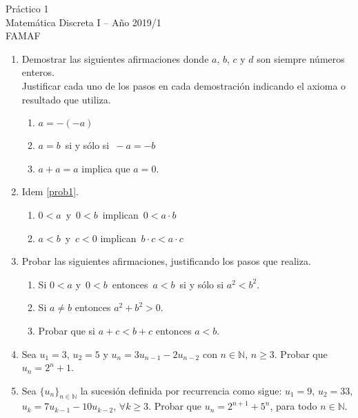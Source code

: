 \documentclass[12pt,spanish,makeidx]{amsbook}
\begin{document}
{\bf \begin{center} Práctico 1 \\ Matemática Discreta I -- Año 2019/1 \\ FAMAF \end{center}}

\smallskip

\begin{enumerate}


\item\label{prob1} Demostrar las siguientes afirmaciones
donde $a$, $b$, $c$ y $d$ son siempre n\'umeros enteros.\\
Justificar cada uno de los pasos en cada demostraci\'on indicando el axioma o resultado que utiliza.
\begin{enumerate}
\item  $a=-(-a)$
\item  $a=b\,$ si y sólo si $\,-a=-b$
\item  $a+a=a$ implica que  $a=0$.
\end{enumerate}


\medskip

\item Idem \ref{prob1}.

\begin{enumerate}
 \item $0<a\,$ y $\,0<b\,$ implican $\,0<a\cdot b$
 \item $a<b\,$ y $\,c<0$ implican $\,b\cdot c<a\cdot c$
\end{enumerate}

\medskip

\item  Probar las siguientes afirmaciones, justificando los pasos que realiza.
\begin{enumerate}
  \item Si $0 < a$  y $\,0<b\,$ entonces $\,a<b\,$ si y s\'olo si $a^2<b^2$.
  \item Si $a\neq b$  entonces $a^2+b^2>0$.
  \item Probar que si $a+c <b+c$ entonces $a<b$.
\end{enumerate}

\medskip


\item Sea $u_1=3$, $u_2=5$ y $u_n=3 u_{n-1} - 2 u_{n-2}$ con $n\in \mathbb N$, $n\geq 3$.
Probar que $u_n=2^n+1$.

\smallskip

\item Sea $\{ u_n \}_{n \in \mathbb N}$ la sucesi\' on definida
por recurrencia como sigue: $u_1 = 9$, $u_2 = 33$, $u_k = 7u_{k-1} - 10u_{k-2}$, $\forall k \geq 3$.
Probar que $u_n = 2^{n+1} + 5^n$, para todo $n \in \mathbb N$.


\end{enumerate}
\end{document}
